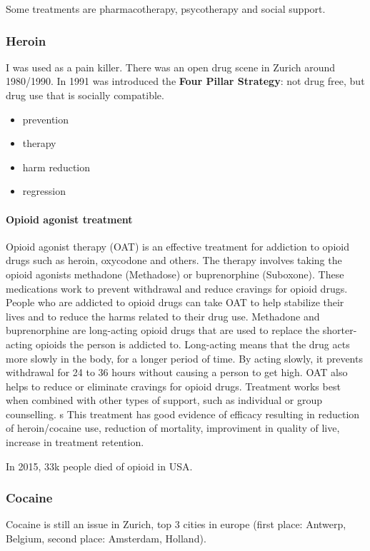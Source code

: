 \documentclass[12pt,article,oneside,a4paper]{memoir}
\begin{document}
Some treatments are pharmacotherapy, psycotherapy and social support.

\subsubsection{Heroin}
I was used as a pain killer. There was an open drug scene in Zurich around 1980/1990.
In 1991 was introduced the \textbf{Four Pillar Strategy}: not drug free, but drug use that is socially compatible.
\begin{itemize}
\item prevention
\item therapy
\item harm reduction
\item regression
\end{itemize}

\paragraph{Opioid agonist treatment}
Opioid agonist therapy (OAT) is an effective treatment for addiction to opioid drugs such as heroin, oxycodone and others. The therapy involves taking the opioid agonists methadone (Methadose) or buprenorphine (Suboxone). These medications work to prevent withdrawal and reduce cravings for opioid drugs. People who are addicted to opioid drugs can take OAT to help stabilize their lives and to reduce the harms related to their drug use. 
Methadone and buprenorphine are long-acting opioid drugs that are used to replace the shorter-acting opioids the person is addicted to. Long-acting means that the drug acts more slowly in the body, for a longer period of time. By acting slowly, it prevents withdrawal for 24 to 36 hours without causing a person to get high. OAT also helps to reduce or eliminate cravings for opioid drugs. Treatment works best when combined with other types of support, such as individual or group counselling. 
s
This treatment has good evidence of efficacy resulting in reduction of heroin/cocaine use, reduction of mortality, improviment in quality of live, increase in treatment retention.

In 2015, 33k people died of opioid in USA.

\subsubsection{Cocaine}
Cocaine is still an issue in Zurich, top 3 cities in europe (first place: Antwerp, Belgium, second place: Amsterdam, Holland).
\end{document}
